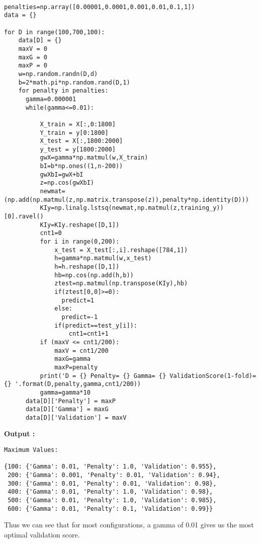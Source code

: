 \documentclass[a4paper, 11pt]{article}
\begin{document}
\begin{lstlisting}

penalties=np.array([0.00001,0.0001,0.001,0.01,0.1,1])
data = {}
  
for D in range(100,700,100):
    data[D] = {}
    maxV = 0
    maxG = 0
    maxP = 0
    w=np.random.randn(D,d)
    b=2*math.pi*np.random.rand(D,1)
    for penalty in penalties:
      gamma=0.000001
      while(gamma<=0.01):

          X_train = X[:,0:1800]
          Y_train = y[0:1800]
          X_test = X[:,1800:2000]
          y_test = y[1800:2000]
          gwX=gamma*np.matmul(w,X_train)
          bI=b*np.ones((1,n-200))
          gwXbI=gwX+bI
          z=np.cos(gwXbI)
          newmat=(np.add(np.matmul(z,np.matrix.transpose(z)),penalty*np.identity(D)))
          KIy=np.linalg.lstsq(newmat,np.matmul(z,training_y))[0].ravel()
          KIy=KIy.reshape([D,1])
          cnt1=0
          for i in range(0,200):
              x_test = X_test[:,i].reshape([784,1])
              h=gamma*np.matmul(w,x_test)
              h=h.reshape([D,1])
              hb=np.cos(np.add(h,b))
              ztest=np.matmul(np.transpose(KIy),hb)
              if(ztest[0,0]>=0):
                predict=1
              else:
                predict=-1
              if(predict==test_y[i]):
                  cnt1=cnt1+1
          if (maxV <= cnt1/200):
              maxV = cnt1/200
              maxG=gamma
              maxP=penalty
          print('D = {} Penalty= {} Gamma= {} ValidationScore(1-fold)= {} '.format(D,penalty,gamma,cnt1/200))
          gamma=gamma*10
      data[D]['Penalty'] = maxP
      data[D]['Gamma'] = maxG
      data[D]['Validation'] = maxV

\end{lstlisting}


\textbf{Output :}
\begin{verbatim}
Maximum Values:

{100: {'Gamma': 0.01, 'Penalty': 1.0, 'Validation': 0.955},
 200: {'Gamma': 0.001, 'Penalty': 0.01, 'Validation': 0.94},
 300: {'Gamma': 0.01, 'Penalty': 0.01, 'Validation': 0.98},
 400: {'Gamma': 0.01, 'Penalty': 1.0, 'Validation': 0.98},
 500: {'Gamma': 0.01, 'Penalty': 1.0, 'Validation': 0.985},
 600: {'Gamma': 0.01, 'Penalty': 0.1, 'Validation': 0.99}}
\end{verbatim}

Thus we can see that for most configurations, a gamma of 0.01 gives us the most optimal validation score.

\clearpage
\end{document}
